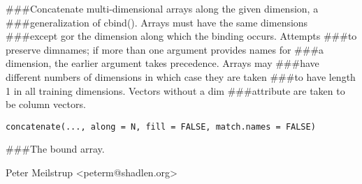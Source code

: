 \begin{Description}\relax
\#\#\#Concatenate multi-dimensional arrays along the given dimension, a \#\#\#generalization of cbind().  Arrays must have the same dimensions \#\#\#except gor the dimension along which the binding occurs. Attempts \#\#\#to preserve dimnames; if more than one argument provides names for \#\#\#a dimension, the earlier argument takes precedence.  Arrays may \#\#\#have different numbers of dimensions in which case they are taken \#\#\#to have length 1 in all training dimensions. Vectors without a dim \#\#\#attribute are taken to be column vectors.
\end{Description}
\begin{Usage}
\begin{verbatim}
concatenate(..., along = N, fill = FALSE, match.names = FALSE)
\end{verbatim}
\end{Usage}
\begin{Arguments}
\begin{ldescription}
\item[\code{...}] 
\item[\code{along}] 
\item[\code{fill}] 
\item[\code{match.names}] 
\end{ldescription}
\end{Arguments}
\begin{Value}
\#\#\#The bound array.
\end{Value}
\begin{Author}\relax
Peter Meilstrup \textless{}peterm@shadlen.org\textgreater{}
\end{Author}

